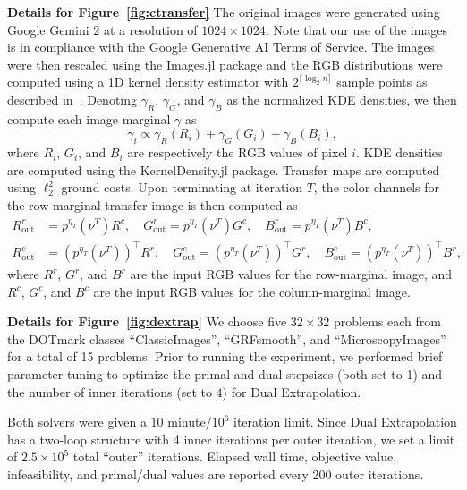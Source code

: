 \documentclass[10pt]{article}
\theoremstyle{plain}
\theoremstyle{definition}
\theoremstyle{remark}
\begin{document}
\vspace{1em}\noindent\textbf{Details for Figure~\ref{fig:ctransfer}}
The original images were generated using Google Gemini 2 at a resolution of $1024\times 1024$. Note that our use of the images is in compliance with the Google Generative AI Terms of Service. The images were then rescaled using the Images.jl package and the RGB distributions were computed using a 1D kernel density estimator with $2^{\lceil{\log_2 n}\rceil}$ sample points as described in~\cite{pitie2007automated}. Denoting $\gamma_R$, $\gamma_G$, and $\gamma_B$ as the normalized KDE densities, we then compute each image marginal $\gamma$ as
\begin{equation*}
    \gamma_i \propto {\gamma_R(R_i) + \gamma_G(G_i) + \gamma_B(B_i)},
\end{equation*}
where $R_i$, $G_i$, and $B_i$ are respectively the RGB values of pixel $i$.
KDE densities are computed using the KernelDensity.jl package. Transfer maps are computed using $\ell_2^2$ ground costs. Upon terminating at iteration $T$, the color channels for the row-marginal transfer image is then computed as
\begin{align*}
    R^r_{\textrm{out}}&=p^{\eta_{T}}(\nu^{T})R^c,\quad
    G^r_\textrm{out}=p^{\eta_{T}}(\nu^{T})G^c,\quad
    B^r_\textrm{out}=p^{\eta_{T}}(\nu^{T})B^c, \\
    R^c_{\textrm{out}}&=(p^{\eta_{T}}(\nu^{T}))^\top R^r,\quad
    G^c_\textrm{out}=(p^{\eta_{T}}(\nu^{T}))^\top G^r,\quad
    B^c_\textrm{out}=(p^{\eta_{T}}(\nu^{T}))^\top B^r,
\end{align*}
where $R^r$, $G^r$, and $B^r$ are the input RGB values for the row-marginal image, and $R^c$, $G^c$, and $B^c$ are the input RGB values for the column-marginal image.

\vspace{1em}\noindent\textbf{Details for Figure~\ref{fig:dextrap}}
We choose five $32\times 32$ problems each from the DOTmark classes ``ClassicImages'', ``GRFsmooth'', and ``MicroscopyImages'' for a total of 15 problems. Prior to running the experiment, we performed brief parameter tuning to optimize the primal and dual stepsizes (both set to 1) and the number of inner iterations (set to 4) for Dual Extrapolation.

Both solvers were given a 10 minute/$10^6$ iteration limit. Since Dual Extrapolation has a two-loop structure with 4 inner iterations per outer iteration, we set a limit of $2.5\times 10^5$ total ``outer'' iterations. Elapsed wall time, objective value, infeasibility, and primal/dual values are reported every 200 outer iterations. 
\end{document}
